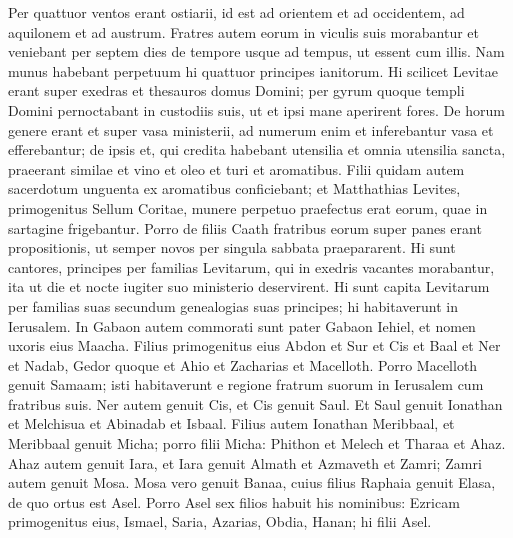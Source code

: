 \begin{biblechapter}
\verse Per quattuor ventos erant ostiarii, id est ad orientem et ad occidentem, ad aquilonem et ad austrum.  
\verse Fratres autem eorum in viculis suis morabantur et veniebant per septem dies de tempore usque ad tempus, ut essent cum illis. 
\verse Nam munus habebant perpetuum hi quattuor principes ianitorum. Hi scilicet Levitae erant super exedras et thesauros domus Domini; 
\verse per gyrum quoque templi Domini pernoctabant in custodiis suis, ut et ipsi mane aperirent fores. 
\verse De horum genere erant et super vasa ministerii, ad numerum enim et inferebantur vasa et efferebantur; 
\verse de ipsis et, qui credita habebant utensilia et omnia utensilia sancta, praeerant similae et vino et oleo et turi et aromatibus. 
\verse Filii quidam autem sacerdotum unguenta ex aromatibus conficiebant; 
\verse et Matthathias Levites, primogenitus Sellum Coritae, munere perpetuo praefectus erat eorum, quae in sartagine frigebantur. 
\verse Porro de filiis Caath fratribus eorum super panes erant propositionis, ut semper novos per singula sabbata praepararent. 
\verse Hi sunt cantores, principes per familias Levitarum, qui in exedris vacantes morabantur, ita ut die et nocte iugiter suo ministerio deservirent. 
\verse Hi sunt capita Levitarum per familias suas secundum genealogias suas principes; hi habitaverunt in Ierusalem. 
\verse In Gabaon autem commorati sunt pater Gabaon Iehiel, et nomen uxoris eius Maacha. 
\verse Filius primogenitus eius Abdon et Sur et Cis et Baal et Ner et Nadab, 
\verse Gedor quoque et Ahio et Zacharias et Macelloth. 
\verse Porro Macelloth genuit Samaam; isti habitaverunt e regione fratrum suorum in Ierusalem cum fratribus suis. 
\verse Ner autem genuit Cis, et Cis genuit Saul. Et Saul genuit Ionathan et Melchisua et Abinadab et Isbaal. 
\verse Filius autem Ionathan Meribbaal, et Meribbaal genuit Micha; 
\verse porro filii Micha: Phithon et Melech et Tharaa et Ahaz. 
\verse Ahaz autem genuit Iara, et Iara genuit Almath et Azmaveth et Zamri; Zamri autem genuit Mosa. 
\verse Mosa vero genuit Banaa, cuius filius Raphaia genuit Elasa, de quo ortus est Asel. 
\verse Porro Asel sex filios habuit his nominibus: Ezricam primogenitus eius, Ismael, Saria, Azarias, Obdia, Hanan; hi filii Asel. 
\end{biblechapter}

